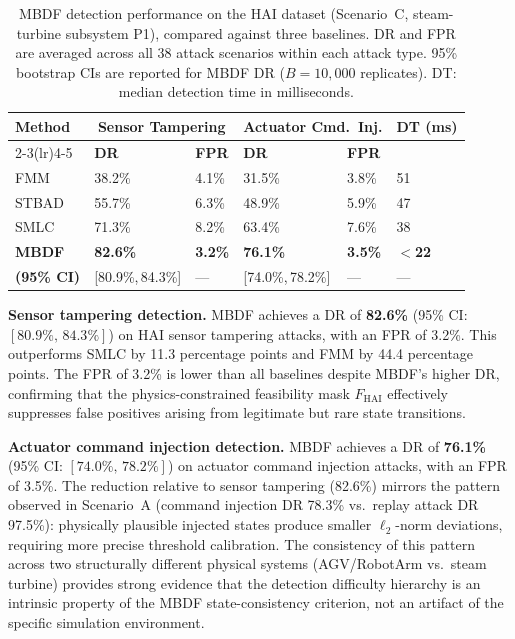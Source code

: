 \documentclass[manuscript,screen,review]{acmart}
\begin{document}
\begin{table}[!t]
\renewcommand{\arraystretch}{1.3}
\caption{MBDF detection performance on the HAI dataset
(Scenario~C, steam-turbine subsystem P1), compared
against three baselines. DR and FPR are averaged across
all 38 attack scenarios within each attack type.
95\% bootstrap CIs are reported for MBDF DR
($B = 10{,}000$ replicates).
DT: median detection time in milliseconds.}
\label{tab:hai_results}
\centering
\small
\begin{tabular}{llllll}
\toprule
\textbf{Method} &
\multicolumn{2}{c}{\textbf{Sensor Tampering}} &
\multicolumn{2}{c}{\textbf{Actuator Cmd.\ Inj.}} &
\textbf{DT (ms)} \\
\cmidrule(lr){2-3}\cmidrule(lr){4-5}
& \textbf{DR} & \textbf{FPR}
& \textbf{DR} & \textbf{FPR} & \\
\midrule
FMM   & 38.2\% & 4.1\% & 31.5\% & 3.8\% & 51 \\
STBAD & 55.7\% & 6.3\% & 48.9\% & 5.9\% & 47 \\
SMLC  & 71.3\% & 8.2\% & 63.4\% & 7.6\% & 38 \\
\midrule
\textbf{MBDF} &
  \textbf{82.6\%} & \textbf{3.2\%} &
  \textbf{76.1\%} & \textbf{3.5\%} &
  \textbf{$<$22} \\
\textbf{(95\% CI)} &
  {[80.9\%,\,84.3\%]} & --- &
  {[74.0\%,\,78.2\%]} & --- & --- \\
\bottomrule
\end{tabular}
\end{table}

\textbf{Sensor tampering detection.}
MBDF achieves a DR of \textbf{82.6\%} (95\% CI:
$[80.9\%,\,84.3\%]$) on HAI sensor tampering attacks,
with an FPR of 3.2\%. This outperforms SMLC by
11.3 percentage points and FMM by 44.4 percentage points.
The FPR of 3.2\% is lower than all baselines despite
MBDF's higher DR, confirming that the physics-constrained
feasibility mask $F_{\mathrm{HAI}}$ effectively suppresses
false positives arising from legitimate but rare state
transitions.

\textbf{Actuator command injection detection.}
MBDF achieves a DR of \textbf{76.1\%} (95\% CI:
$[74.0\%,\,78.2\%]$) on actuator command injection
attacks, with an FPR of 3.5\%. The reduction relative
to sensor tampering (82.6\%) mirrors the pattern observed
in Scenario~A (command injection DR 78.3\% vs.\ replay
attack DR 97.5\%): physically plausible injected states
produce smaller $\ell_2$-norm deviations, requiring more
precise threshold calibration. The consistency of this
pattern across two structurally different physical systems
(AGV/RobotArm vs.\ steam turbine) provides strong evidence
that the detection difficulty hierarchy is an intrinsic
property of the MBDF state-consistency criterion, not an
artifact of the specific simulation environment.
\end{document}
